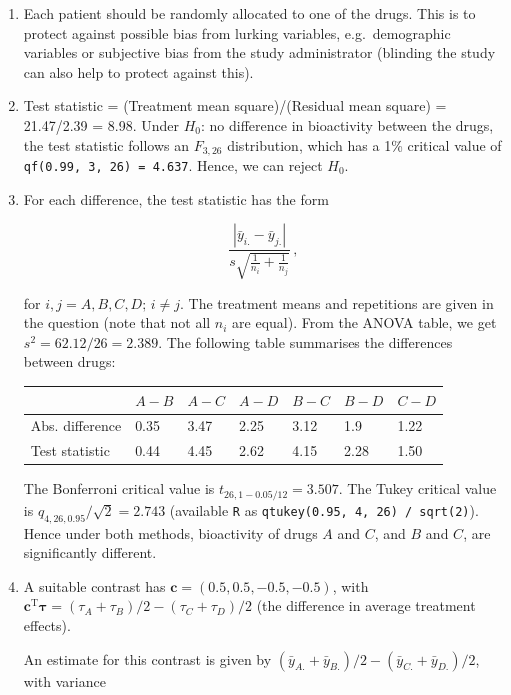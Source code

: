 \documentclass[
]{book}
\theoremstyle{definition}
\theoremstyle{definition}
\theoremstyle{definition}
\theoremstyle{definition}
\theoremstyle{remark}
\begin{document}
\begin{enumerate}
\def\labelenumi{\roman{enumi}.}
\item
  Each patient should be randomly allocated to one of the drugs. This is to protect against possible bias from lurking variables, e.g.~demographic variables or subjective bias from the study administrator (blinding the study can also help to protect against this).
\item
  Test statistic = (Treatment mean square)/(Residual mean square) = 21.47/2.39 = 8.98. Under \(H_0\): no difference in bioactivity between the drugs, the test statistic follows an \(F_{3,26}\) distribution, which has a 1\% critical value of \texttt{qf(0.99,\ 3,\ 26)\ =\ 4.637}. Hence, we can reject \(H_0\).
\item
  For each difference, the test statistic has the form

  \[
   \frac{|\bar{y}_{i.}-\bar{y}_{j.}|}{s\sqrt{\frac{1}{n_i}+\frac{1}{n_j}}}\,,
   \]

  for \(i, j = A, B, C, D;\, i\ne j\). The treatment means and repetitions are given in the question (note that not all \(n_i\) are equal). From the ANOVA table, we get \(s^2 = 62.12/26 = 2.389\). The following table summarises the differences between drugs:

  \begin{longtable}[]{@{}lllllll@{}}
  \toprule
  & \(A-B\) & \(A-C\) & \(A-D\) & \(B-C\) & \(B-D\) & \(C-D\) \\
  \midrule
  \endhead
  Abs. difference & 0.35 & 3.47 & 2.25 & 3.12 & 1.9 & 1.22 \\
  Test statistic & 0.44 & 4.45 & 2.62 & 4.15 & 2.28 & 1.50 \\
  \bottomrule
  \end{longtable}

  The Bonferroni critical value is \(t_{26, 1-0.05/12} = 3.507\). The Tukey critical value is \(q_{4,26, 0.95}/\sqrt{2} = 2.743\) (available \texttt{R} as \texttt{qtukey(0.95,\ 4,\ 26)\ /\ sqrt(2)}). Hence under both methods, bioactivity of drugs \(A\) and \(C\), and \(B\) and \(C\), are significantly different.
\item
  A suitable contrast has \(\boldsymbol{c} = (0.5, 0.5, -0.5, -0.5)\), with \(\boldsymbol{c}^{\mathrm{T}}\boldsymbol{\tau} = (\tau_A + \tau_B) / 2 - (\tau_C + \tau_D) / 2\) (the difference in average treatment effects).

  An estimate for this contrast is given by \((\bar{y}_{A.} + \bar{y}_{B.}) / 2 - (\bar{y}_{C.} + \bar{y}_{D.}) / 2\), with variance


\end{enumerate}
\end{document}

